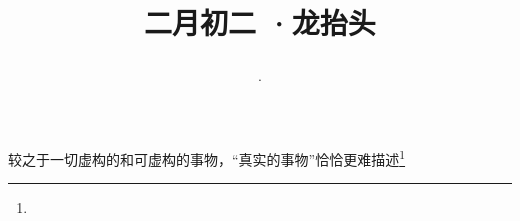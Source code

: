 \title{\date[d=11,m=3,y=2024][year:cn-y,年,month:cn,day:cn,日,·,weekday]·二月初二 ·龙抬头}
较之于一切虚构的和可虚构的事物，“真实的事物”恰恰更难描述\footnote{ }

